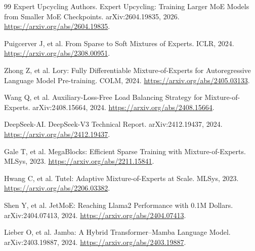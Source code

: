 \documentclass[10pt,a4paper,fontset=none]{ctexart}
\begin{document}
\begin{thebibliography}{99}
Expert Upcycling Authors. Expert Upcycling: Training Larger MoE Models from Smaller MoE Checkpoints. arXiv:2604.19835, 2026. \url{https://arxiv.org/abs/2604.19835}.

Puigcerver J, et al. From Sparse to Soft Mixtures of Experts. ICLR, 2024. \url{https://arxiv.org/abs/2308.00951}.

Zhong Z, et al. Lory: Fully Differentiable Mixture-of-Experts for Autoregressive Language Model Pre-training. COLM, 2024. \url{https://arxiv.org/abs/2405.03133}.

Wang Q, et al. Auxiliary-Loss-Free Load Balancing Strategy for Mixture-of-Experts. arXiv:2408.15664, 2024. \url{https://arxiv.org/abs/2408.15664}.

DeepSeek-AI. DeepSeek-V3 Technical Report. arXiv:2412.19437, 2024. \url{https://arxiv.org/abs/2412.19437}.

Gale T, et al. MegaBlocks: Efficient Sparse Training with Mixture-of-Experts. MLSys, 2023. \url{https://arxiv.org/abs/2211.15841}.

Hwang C, et al. Tutel: Adaptive Mixture-of-Experts at Scale. MLSys, 2023. \url{https://arxiv.org/abs/2206.03382}.

Shen Y, et al. JetMoE: Reaching Llama2 Performance with 0.1M Dollars. arXiv:2404.07413, 2024. \url{https://arxiv.org/abs/2404.07413}.

Lieber O, et al. Jamba: A Hybrid Transformer--Mamba Language Model. arXiv:2403.19887, 2024. \url{https://arxiv.org/abs/2403.19887}.

\end{thebibliography}
\end{document}
